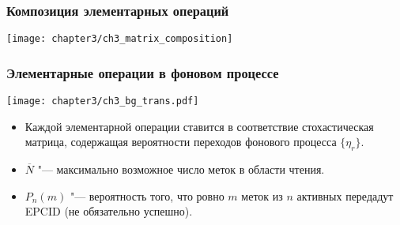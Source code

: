 \begin{frame}
    \frametitle{Композиция элементарных операций}
    \begin{center}
        \texttt{[image: chapter3/ch3\_matrix\_composition]}
    \end{center}
\end{frame}


\begin{frame}
    \frametitle{Элементарные операции в фоновом процессе}
    \begin{center}
        \texttt{[image: chapter3/ch3\_bg\_trans.pdf]}
    \end{center}

    \footnotesize
    \begin{itemize}
        \item Каждой элементарной операции ставится в соответствие стохастическая матрица, содержащая вероятности переходов фонового процесса $\{ \eta_r \}$.
        \item $\overline{N}$ "--- максимально возможное число меток в области чтения.
        \item $P_n(m)$ "--- вероятность того, что ровно $m$ меток из $n$ активных передадут EPCID (не обязательно успешно).
    \end{itemize}
\end{frame}

